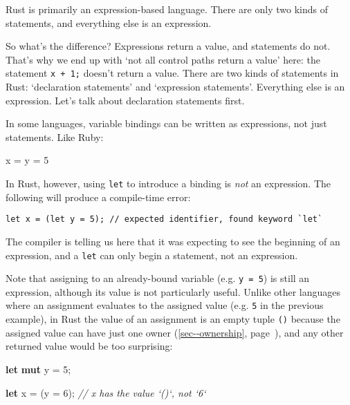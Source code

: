 \documentclass[a4paper,]{book}
\renewcommand*{\hyperref}[2][\ar]{%
  \def\ar{#2}%
  #2 (\autoref{#1}, page~\pageref{#1})}
\newenvironment{Shaded}{\begin{snugshade}}{\end{snugshade}}
\newcommand{\KeywordTok}[1]{\textcolor[rgb]{0.13,0.29,0.53}{\textbf{{#1}}}}
\newcommand{\DecValTok}[1]{\textcolor[rgb]{0.00,0.00,0.81}{{#1}}}
\newcommand{\CommentTok}[1]{\textcolor[rgb]{0.56,0.35,0.01}{\textit{{#1}}}}
\newcommand{\NormalTok}[1]{{#1}}
\begin{document}
Rust is primarily an expression-based language. There are only two kinds
of statements, and everything else is an expression.

So what's the difference? Expressions return a value, and statements do
not. That's why we end up with `not all control paths return a value'
here: the statement \texttt{x\ +\ 1;} doesn't return a value. There are
two kinds of statements in Rust: `declaration statements' and
`expression statements'. Everything else is an expression. Let's talk
about declaration statements first.

In some languages, variable bindings can be written as expressions, not
just statements. Like Ruby:

\begin{Shaded}
\begin{Highlighting}[]
\NormalTok{x = y = }\DecValTok{5}
\end{Highlighting}
\end{Shaded}

In Rust, however, using \texttt{let} to introduce a binding is
\emph{not} an expression. The following will produce a compile-time
error:

\begin{verbatim}
let x = (let y = 5); // expected identifier, found keyword `let`
\end{verbatim}

The compiler is telling us here that it was expecting to see the
beginning of an expression, and a \texttt{let} can only begin a
statement, not an expression.

Note that assigning to an already-bound variable (e.g. \texttt{y\ =\ 5})
is still an expression, although its value is not particularly useful.
Unlike other languages where an assignment evaluates to the assigned
value (e.g. \texttt{5} in the previous example), in Rust the value of an
assignment is an empty tuple \texttt{()} because the assigned value can
have \hyperref[sec--ownership]{just one owner}, and any other returned
value would be too surprising:

\begin{Shaded}
\begin{Highlighting}[]
\KeywordTok{let} \KeywordTok{mut} \NormalTok{y = }\DecValTok{5}\NormalTok{;}

\KeywordTok{let} \NormalTok{x = (y = }\DecValTok{6}\NormalTok{);  }\CommentTok{// x has the value `()`, not `6`}
\end{Highlighting}
\end{Shaded}
\end{document}
